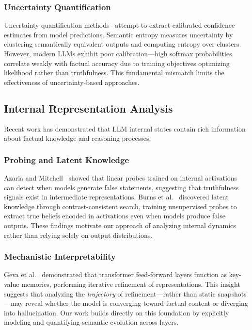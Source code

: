 \documentclass[11pt]{article}
\begin{document}
\subsubsection{Uncertainty Quantification}

Uncertainty quantification methods~\cite{kuhn2023semantic} attempt to extract calibrated confidence estimates from model predictions. Semantic entropy measures uncertainty by clustering semantically equivalent outputs and computing entropy over clusters. However, modern LLMs exhibit poor calibration—high softmax probabilities correlate weakly with factual accuracy due to training objectives optimizing likelihood rather than truthfulness. This fundamental mismatch limits the effectiveness of uncertainty-based approaches.

\subsection{Internal Representation Analysis}

Recent work has demonstrated that LLM internal states contain rich information about factual knowledge and reasoning processes.

\subsubsection{Probing and Latent Knowledge}

Azaria and Mitchell~\cite{azaria2023internal} showed that linear probes trained on internal activations can detect when models generate false statements, suggesting that truthfulness signals exist in intermediate representations. Burns et al.~\cite{burns2022discovering} discovered latent knowledge through contrast-consistent search, training unsupervised probes to extract true beliefs encoded in activations even when models produce false outputs. These findings motivate our approach of analyzing internal dynamics rather than relying solely on output distributions.

\subsubsection{Mechanistic Interpretability}

Geva et al.~\cite{geva2021transformer} demonstrated that transformer feed-forward layers function as key-value memories, performing iterative refinement of representations. This insight suggests that analyzing the \emph{trajectory} of refinement—rather than static snapshots—may reveal whether the model is converging toward factual content or diverging into hallucination. Our work builds directly on this foundation by explicitly modeling and quantifying semantic evolution across layers.
\end{document}

